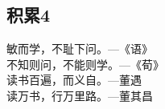 \subsection{积累4}
\begin{pinyinscope}
	\huge
	\noindent 敏而学，不耻下问。---{\kaishu \large 《语》}\\
	不知则问，不能则学。---{\kaishu \large 《荀》}\\
	读书百遍，而义自。---{\kaishu \large 董遇}\\
	读万书，行万里路。---{\kaishu \large 董其昌}
\end{pinyinscope}